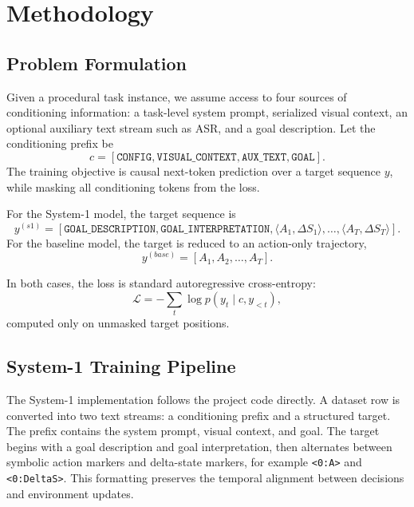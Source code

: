 \documentclass[11pt]{article}
\begin{document}
\section{Methodology}
\subsection{Problem Formulation}
Given a procedural task instance, we assume access to four sources of conditioning information: a task-level system prompt, serialized visual context, an optional auxiliary text stream such as ASR, and a goal description. Let the conditioning prefix be
\begin{equation}
  c = [\texttt{CONFIG}, \texttt{VISUAL\_CONTEXT}, \texttt{AUX\_TEXT}, \texttt{GOAL}].
\end{equation}
The training objective is causal next-token prediction over a target sequence $y$, while masking all conditioning tokens from the loss.

For the System-1 model, the target sequence is
\begin{equation}
  y^{(s1)} = [\texttt{GOAL\_DESCRIPTION}, \texttt{GOAL\_INTERPRETATION}, \langle A_1, \Delta S_1 \rangle, \dots, \langle A_T, \Delta S_T \rangle].
\end{equation}
For the baseline model, the target is reduced to an action-only trajectory,
\begin{equation}
  y^{(base)} = [A_1, A_2, \dots, A_T].
\end{equation}

In both cases, the loss is standard autoregressive cross-entropy:
\begin{equation}
  \mathcal{L} = - \sum_{t} \log p(y_t \mid c, y_{<t}),
\end{equation}
computed only on unmasked target positions.

\subsection{System-1 Training Pipeline}
The System-1 implementation follows the project code directly. A dataset row is converted into two text streams: a conditioning prefix and a structured target. The prefix contains the system prompt, visual context, and goal. The target begins with a goal description and goal interpretation, then alternates between symbolic action markers and delta-state markers, for example \texttt{<0:A>} and \texttt{<0:DeltaS>}. This formatting preserves the temporal alignment between decisions and environment updates.
\end{document}
